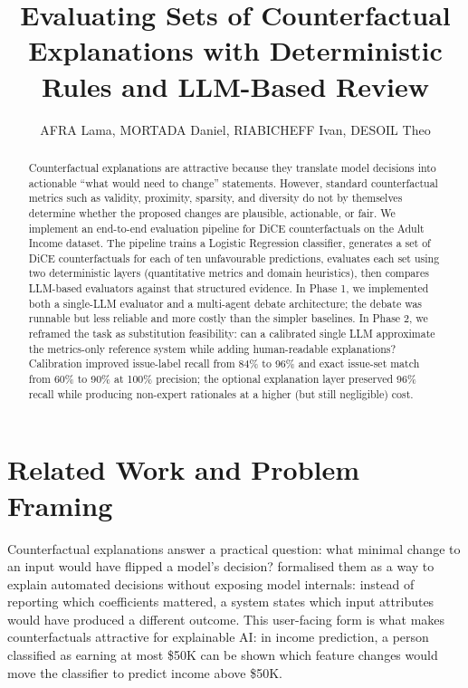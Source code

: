 \documentclass[letterpaper]{article}
\title{Evaluating Sets of Counterfactual Explanations with Deterministic Rules and LLM-Based Review}
\author{
    AFRA Lama,
    MORTADA Daniel,
    RIABICHEFF Ivan,
    DESOIL Theo
}
\begin{document}
\maketitle
\thispagestyle{plain}
\pagestyle{plain}

\begin{abstract}
Counterfactual explanations are attractive because they translate model decisions into actionable ``what would need to change'' statements. However, standard counterfactual metrics such as validity, proximity, sparsity, and diversity do not by themselves determine whether the proposed changes are plausible, actionable, or fair. We implement an end-to-end evaluation pipeline for DiCE counterfactuals on the Adult Income dataset. The pipeline trains a Logistic Regression classifier, generates a set of DiCE counterfactuals for each of ten unfavourable predictions, evaluates each set using two deterministic layers (quantitative metrics and domain heuristics), then compares LLM-based evaluators against that structured evidence. In Phase 1, we implemented both a single-LLM evaluator and a multi-agent debate architecture; the debate was runnable but less reliable and more costly than the simpler baselines. In Phase 2, we reframed the task as substitution feasibility: can a calibrated single LLM approximate the metrics-only reference system while adding human-readable explanations? Calibration improved issue-label recall from 84\% to 96\% and exact issue-set match from 60\% to 90\% at 100\% precision; the optional explanation layer preserved 96\% recall while producing non-expert rationales at a higher (but still negligible) cost.
\end{abstract}

\section{Related Work and Problem Framing}
Counterfactual explanations answer a practical question: what minimal change to an input would have flipped a model's decision? \citet{wachter2017counterfactual} formalised them as a way to explain automated decisions without exposing model internals: instead of reporting which coefficients mattered, a system states which input attributes would have produced a different outcome. This user-facing form is what makes counterfactuals attractive for explainable AI: in income prediction, a person classified as earning at most \$50K can be shown which feature changes would move the classifier to predict income above \$50K.
\end{document}

